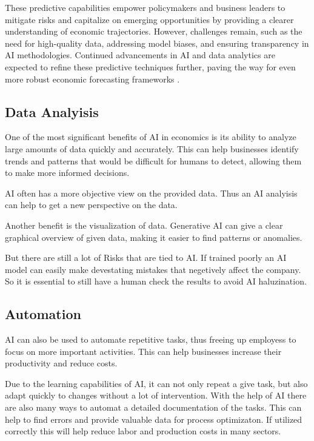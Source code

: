 These predictive capabilities empower policymakers and business leaders to mitigate risks and capitalize on emerging opportunities by providing a clearer understanding of economic trajectories. However, challenges remain, such as the need for high-quality data, addressing model biases, and ensuring transparency in AI methodologies. Continued advancements in AI and data analytics are expected to refine these predictive techniques further, paving the way for even more robust economic forecasting frameworks \cite{Predictive-Analysis-ai}.


\subsection{Data Analyisis}
\label{subsec:data-analysis}

One of the most significant benefits of AI in economics is its ability to analyze large amounts of data quickly and accurately. 
This can help businesses identify trends and patterns that would be difficult for humans to detect, allowing them to make more informed decisions.

AI often has a more objective view on the provided data. Thus an AI analyisis can help to get a new perspective on the data. 

Another benefit is the visualization of data. Generative AI can give a clear graphical overview of given data, making it easier to find patterns or anomalies. 

But there are still a lot of Risks that are tied to AI.
If trained poorly an AI model can easily make devestating mistakes that negetively affect the company.
So it is essential to still have a human check the results to avoid AI haluzination.

\cite{AiDataAnalysis}

\subsection{Automation}
\label{subsec:automation}

AI can also be used to automate repetitive tasks, thus freeing up employess to focus on more important activities.
This can help businesses increase their productivity and reduce costs.

Due to the learning capabilities of AI, it can not only repeat a give task, but also adapt quickly to changes without a lot of intervention.
With the help of AI there are also many ways to automat a detailed documentation of the tasks. This can help to find errors and provide valuable data for process optimizaton. 
If utilized correctly this will help reduce labor and production costs in many sectors. 

